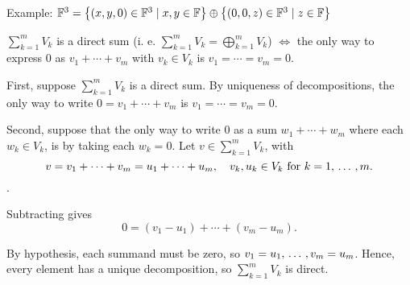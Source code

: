 \begin{example}
  Example: $\mathbb{F}^3 =
  \left \{ \left ( x, y, 0 \right ) \in \mathbb{F}^3 \mid x,y \in \mathbb{F} \right \}
  \oplus
  \left \{ \left (  0, 0, z  \right ) \in \mathbb{F}^3 \mid z \in \mathbb{F} \right \}$
\end{example}


\setcounter{thm}{44}
\begin{thm} 
  \label{thm: condition for a direct sum}
  $\sum_{k=1}^m V_k$ is a direct sum (i. e. $\sum_{k=1}^m V_k = \bigoplus_{k=1}^m V_k$) $\iff$ the only way to express $0$ as $v_1 + \cdots + v_m$ with $v_k \in V_k$ is $v_1 = \cdots = v_m = 0$.
\end{thm}
\begin{prf}
    \Rightarrowdirection
    First, suppose $\sum_{k=1}^m V_k$ is a direct sum.
    By uniqueness of decompositions, the only way to write $0 = v_1 + \cdots + v_m$ is $v_1 = \cdots = v_m = 0$.

    \Leftarrowdirection Second, suppose that the only way to write $0$ as a sum $w_1 + \cdots + w_m$ where each $w_k \in V_k$, is by taking each $w_k = 0$. Let $v \in \sum_{k=1}^m V_k$, with
    \begin{equation}
        v = v_1 + \cdots + v_m = u_1 + \cdots + u_m, \quad v_k, u_k \in V_k \text{ for } k=1, {\, \ldots \,\,}, m.
    \end{equation}.

    Subtracting gives
    \begin{equation}
      0=(v_1-u_1)+\cdots+(v_m-u_m).
    \end{equation}

    By hypothesis, each summand must be zero, so $v_1=u_1, {\, \ldots \,\,}, v_m=u_m$.
    Hence, every element has a unique decomposition, so $\sum_{k=1}^m V_k$ is direct.
\end{prf}

